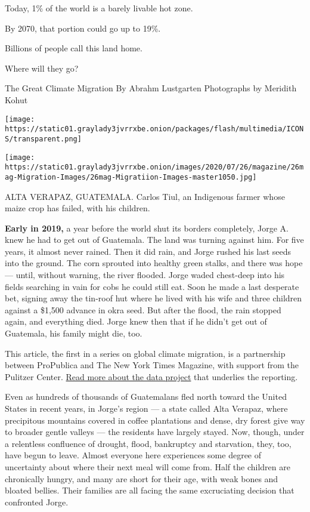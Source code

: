 Today, 1\% of the world is a barely livable hot zone.

By 2070, that portion could go up to 19\%.

Billions of people call this land home.

Where will they go?

The Great Climate Migration By Abrahm Lustgarten \textbar{} Photographs
by Meridith Kohut

\texttt{[image: https://static01.graylady3jvrrxbe.onion/packages/flash/multimedia/ICONS/transparent.png]}

\texttt{[image: https://static01.graylady3jvrrxbe.onion/images/2020/07/26/magazine/26mag-Migration-Images/26mag-Migratiion-Images-master1050.jpg]}

ALTA VERAPAZ, GUATEMALA. Carlos Tiul, an Indigenous farmer whose maize
crop has failed, with his children.

\textbf{Early in 2019,} a year before the world shut its borders
completely, Jorge A. knew he had to get out of Guatemala. The land was
turning against him. For five years, it almost never rained. Then it did
rain, and Jorge rushed his last seeds into the ground. The corn sprouted
into healthy green stalks, and there was hope --- until, without
warning, the river flooded. Jorge waded chest-deep into his fields
searching in vain for cobs he could still eat. Soon he made a last
desperate bet, signing away the tin-roof hut where he lived with his
wife and three children against a \$1,500 advance in okra seed. But
after the flood, the rain stopped again, and everything died. Jorge knew
then that if he didn't get out of Guatemala, his family might die, too.

This article, the first in a series on global climate migration, is a
partnership between ProPublica and The New York Times Magazine, with
support from the Pulitzer Center.
\href{https://www.propublica.org/article/2020-climate-migration-part-1-methodology}{Read
more about the data project} that underlies the reporting.

Even as hundreds of thousands of Guatemalans fled north toward the
United States in recent years, in Jorge's region --- a state called Alta
Verapaz, where precipitous mountains covered in coffee plantations and
dense, dry forest give way to broader gentle valleys --- the residents
have largely stayed. Now, though, under a relentless confluence of
drought, flood, bankruptcy and starvation, they, too, have begun to
leave. Almost everyone here experiences some degree of uncertainty about
where their next meal will come from. Half the children are chronically
hungry, and many are short for their age, with weak bones and bloated
bellies. Their families are all facing the same excruciating decision
that confronted Jorge.

